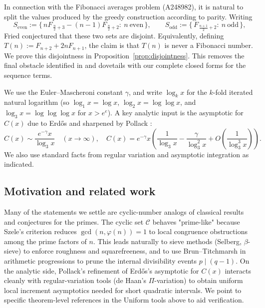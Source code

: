 \documentclass[12pt]{article}
\providecommand{\seqnum}[1]{#1}
\theoremstyle{remark}
\begin{document}
In connection with the Fibonacci averages problem (\seqnum{A248982}), it is natural to split the values produced by the greedy construction according to parity. Writing
\[
 S_{\mathrm{even}}:=\bigl\{\,nF_{\,\frac{n}{2}+3}-(n-1)F_{\,\frac{n}{2}+2}:\ n\ \text{even}\,\bigr\},\qquad
 S_{\mathrm{odd}}:=\bigl\{\,F_{\,\frac{n+1}{2}+2}:\ n\ \text{odd}\,\bigr\},
\]
Fried conjectured that these two sets are disjoint. Equivalently, defining $T(n):=F_{n+2}+2nF_{n+1}$, the claim is that $T(n)$ is never a Fibonacci number. We prove this disjointness in Proposition~\ref{prop:disjointness}. This removes the final obstacle identified in \cite{Fried2025} and dovetails with our complete closed forms for the sequence terms.

We use the Euler--Mascheroni constant $\gamma$, and write $\log_k x$ for the $k$-fold iterated natural logarithm (so $\log_1 x = \log x$, $\log_2 x = \log\log x$, and $\log_3 x = \log\log\log x$ for $x>e^e$). A key analytic input is the asymptotic for $C(x)$ due to Erd\H{o}s and sharpened by Pollack \cite{Pollack2022}:
\begin{equation}\label{eq:Pollack}
 C(x) \sim \frac{e^{-\gamma} x}{\log_3 x} \quad (x\to\infty),\quad C(x) = e^{-\gamma} x\left(\frac{1}{\log_3 x} - \frac{\gamma}{\log_3^2 x} + O\!\left(\frac{1}{\log_3^3 x}\right)\right).
\end{equation}
We also use standard facts from regular variation \cite{BGT1989} and asymptotic integration \cite{deBruijn1970} as indicated.

\subsection*{Motivation and related work}
Many of the statements we settle are cyclic-number analogs of classical results and conjectures for the primes. The cyclic set $\mathcal C$ behaves "prime-like" because Szele's criterion reduces $\gcd(n,\varphi(n))=1$ to local congruence obstructions among the prime factors of $n$. This leads naturally to sieve methods (Selberg, $\beta$-sieve) to enforce roughness and squarefreeness, and to use Brun--Titchmarsh in arithmetic progressions to prune the internal divisibility events $p\mid(q-1)$. On the analytic side, Pollack's refinement of Erd\H{o}s's asymptotic for $C(x)$ interacts cleanly with regular-variation tools (de Haan's $\Pi$-variation) to obtain uniform local increment asymptotics needed for short quadratic intervals. We point to specific theorem-level references in the Uniform tools above to aid verification.
\end{document}
